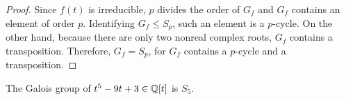 \begin{proof}
    Since $f(t)$ is irreducible, $p$ divides the order of $G_f$ and $G_f$ contains an element of order $p$.
    Identifying $G_f\leq S_p$, such an element is a $p$-cycle.
    On the other hand, because there are only two nonreal complex roots, $G_f$ contains a transposition.
    Therefore, $G_f=S_p$, for $G_f$ contains a $p$-cycle and a transposition.
\end{proof}
\begin{exmp}
    The Galois group of $t^5-9t+3\in{\mathbb{Q}}[t]$ is $S_5$.
\end{exmp}